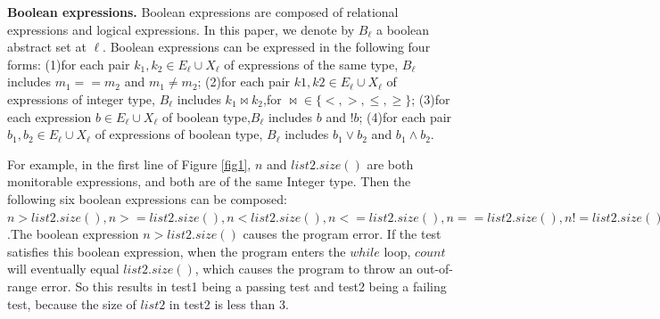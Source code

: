 \documentclass[sn-basic]{sn-jnl}
\theoremstyle{thmstyleone}
\theoremstyle{thmstyletwo}
\theoremstyle{thmstylethree}
\begin{document}
\textbf{Boolean expressions.} Boolean expressions are composed of relational expressions and logical expressions. In this paper, we denote by $B_\ell$ a boolean abstract set at $\ell$. Boolean expressions can be expressed in the following four forms: (1)for each pair $k_1,k_2 \in E_\ell \cup X_\ell$ of expressions of the same type, $B_\ell$ includes $m_1 == m_2$ and $m_1 \neq m_2$; (2)for each pair $k1,k2 \in E_\ell \cup X_\ell$ of expressions of integer type, $B_\ell$ includes $k_1 \bowtie k_2$,for $ \bowtie \in \{ <,>,\leq,\ge \}$; (3)for each expression $b \in E_\ell \cup X_\ell$ of boolean type,$B_\ell$ includes $b$ and $!b$; (4)for each pair $b_1,b_2 \in E_\ell \cup X_\ell$ of expressions of boolean type, $B_\ell$ includes $b_1 \vee b_2$ and $b_1\wedge b_2$.

For example, in the first line of Figure \ref{fig1}, $n$ and $list2.size()$ are both monitorable expressions, and both are of the same Integer type. Then the following six boolean expressions can be composed:  $n>list2.size(), n>=list2.size(), n<list2.size(), n<=list2.size(), n==list2.size(), n!=list2.size()$.The boolean expression $n>list2.size()$ causes the program error. If the test satisfies this boolean expression, when the program enters the $while$ loop, $count$ will eventually equal $list2.size()$, which causes the program to throw an out-of-range error. So this results in test1 being a passing test and test2 being a failing test, because the size of $list2$ in test2 is less than 3.
\end{document}
